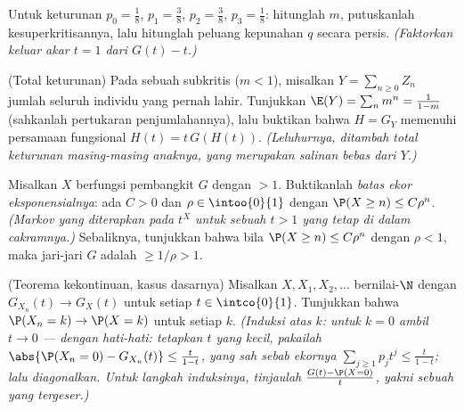 \begin{exercise}[$\star\star$]\label{exo:b2:genfun:6}
Untuk  keturunan $p_0 = \frac18$, $p_1 = \frac38$, $p_2 =
\frac38$, $p_3 = \frac18$: hitunglah $m$, putuskanlah
kesuperkritisannya, lalu hitunglah peluang kepunahan $q$
secara persis. \emph{(Faktorkan keluar akar $t = 1$ dari $G(t) - t$.)}
\end{exercise}

\begin{exercise}[$\star\star\star$]\label{exo:b2:genfun:7}
(Total keturunan) Pada sebuah  subkritis ($m < 1$), misalkan
$Y = \sum_{n\geq0} Z_n$ jumlah seluruh individu yang pernah
lahir. Tunjukkan $\E(Y) = \sum_n m^n = \frac{1}{1 - m}$ (sahkanlah
pertukaran penjumlahannya), lalu buktikan bahwa 
$H = G_Y$ memenuhi persamaan fungsional $H(t) = t\,G(H(t))$.
\emph{(Leluhurnya, ditambah total keturunan masing-masing
anaknya, yang merupakan salinan bebas dari $Y$.)}
\end{exercise}

\begin{exercise}[$\star\star\star$]\label{exo:b2:genfun:8}
Misalkan $X$ berfungsi pembangkit $G$ dengan  $>
1$. Buktikanlah \emph{batas ekor eksponensialnya}: ada $C > 0$ dan
$\rho \in \intoo{0}{1}$ dengan $\P(X \geq n) \leq C\rho^n$.
\emph{(Markov yang diterapkan pada $t^X$ untuk sebuah $t > 1$ yang tetap di dalam
cakramnya.)} Sebaliknya, tunjukkan bahwa bila $\P(X \geq n) \leq C\rho^n$ dengan
$\rho < 1$, maka jari-jari $G$ adalah $\geq 1/\rho > 1$.
\end{exercise}

\begin{exercise}[$\star\star\star$]\label{exo:b2:genfun:9}
(Teorema kekontinuan, kasus dasarnya) Misalkan $X, X_1, X_2, \dots$
bernilai-$\N$ dengan $G_{X_n}(t) \to G_X(t)$ untuk setiap $t \in
\intco{0}{1}$. Tunjukkan bahwa $\P(X_n = k) \to \P(X = k)$ untuk setiap
$k$. \emph{(Induksi atas $k$: untuk $k = 0$ ambil $t \to 0$ ---
dengan hati-hati: tetapkan $t$ yang kecil, pakailah $\abs{\P(X_n = 0) - G_{X_n}(t)}
\leq \frac{t}{1-t}$, yang sah sebab ekornya $\sum_{j \geq 1}p_jt^j
\leq \frac{t}{1 - t}$; lalu diagonalkan. Untuk langkah induksinya,
tinjaulah $\frac{G(t) - \P(X = 0)}{t}$, yakni 
sebuah  yang tergeser.)}
\end{exercise}

